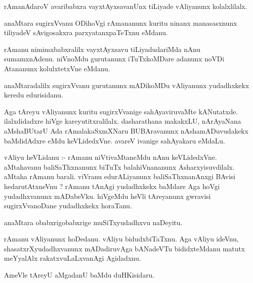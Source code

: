 \documentclass{article}
\begin{document}
\begin{mn}
rAmanAdaroV  avaribabxra  vayxtAyxsavanUnx  tiLiyade  vAliyanunx  kolalxlilalx.
\end{mn}

\begin{mn}
anaMtara  sugirxVvanu  ODihoVgi  rAmananunx  kuritu  ninanx  manasasxnunx  tiliyadeV  sAvigosakxra  parxyatanxpaTeTxnu  eMdanu.
\end{mn}

\begin{mn}
rAmanu  nimimxbabxralilx  vayxtAyxsavu  tiLiyadudariMda  nAnu  sumamxnAdenu.  niVnoMdu  gurutanunx  iTuTxkoMDare  adanunx  
noVDi  Atananunx  kolulxtetxVne  eMdanu.
\end{mn}

\begin{mn}
anaMtaradalilx  sugirxVvanu  gurutanunx  mADikoMDu  vAliyanunx  yudadhxkekx  keredu  edurisidanu.
\end{mn}

\begin{mn}
Aga  tAreyu  vAliyanunx  kuritu  sugirxVvanige  sahAyaviruvaMte  kANutatxde.  ilalxdidadxre  hiVge  kareyutitxralilalx.  
dasharathana  makakxLU,  nArAyaNana  aMshaBUtarU  Ada  rAmalakaSxmXNaru  BUBAravanunx  nAshamADuvudakekx  baMdidAdxre  
eMdu  keVLidedxVne.  avareV  ivanige  sahAyakaru  eMdaLu.  
\end{mn}

\begin{mn}
vAliyu  heVLidanu :- rAmanu  niVtivaMtaneMdu  nAnu  keVLidedxVne.  aMtahavanu  baliSaThxnanunx  biTuTx  balahiVnananunx  Asharxyisuvdilalx.  
aMtaha  rAmanu  barali.  viVranu  edurALiyanunx  baliSaThxnanAnxgi  BAvisi  hedarutAtxneVnu ?  rAmanu  tAnAgi  yudadhxkekx  baMdare  Aga  
hoVgi  yudadhxvanunx  mADabeVku.  hiVgeMdu  heVli  tAreyanunx  gwravisi  sugirxVvanoDane  yudadhxkekx  horaTanu.
\end{mn}

\begin{mn}
anaMtara  obabxrigobabxrige  muSiTxyudadhxvu  naDeyitu.
\end{mn}

\begin{mn}
rAmanu  vAliyanunx  hoDedanu.  vAliyu  bidudxbiTaTxnu.  Aga  vAliyu  ideVnu,  shasatxrXyudadhxvanunx  mADadiruvAga  bANadeVTu  
bididxteMdanu  matutx  meYyalAlx  rakatxvuLaLxvanAgi  Agidadxnu.
\end{mn}

\begin{mn}
AmeVle  tAreyU  aMgadanU  baMdu  duHKisidaru.
\end{mn}
\end{document}
